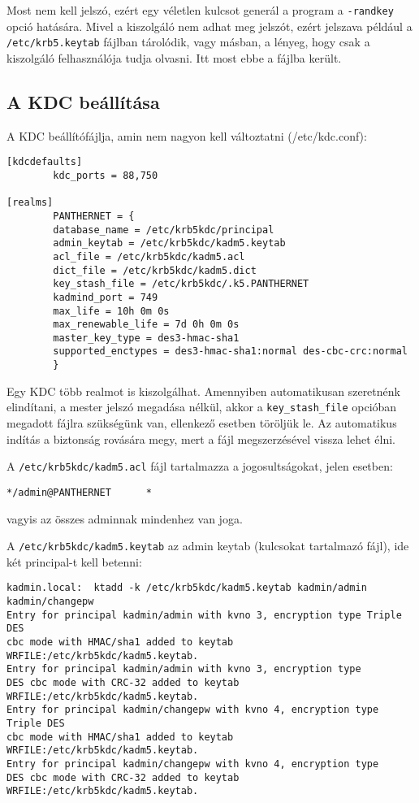 Most nem kell jelszó, ezért egy véletlen kulcsot generál a program a \texttt{-randkey} opció hatására. Mivel a
kiszolgáló nem adhat meg jelszót, ezért jelszava például a \texttt{/etc/krb5.keytab} fájlban tárolódik, vagy másban, a
lényeg, hogy csak a kiszolgáló felhasználója tudja olvasni. Itt most ebbe a fájlba került.


\subsection{A KDC beállítása}
A  KDC beállítófájlja, amin nem nagyon kell változtatni (/etc/kdc.conf):


\begin{Verbatim}[frame=single,label=kdc.conf]
[kdcdefaults]
        kdc_ports = 88,750

[realms]
        PANTHERNET = {
        database_name = /etc/krb5kdc/principal
        admin_keytab = /etc/krb5kdc/kadm5.keytab
        acl_file = /etc/krb5kdc/kadm5.acl
        dict_file = /etc/krb5kdc/kadm5.dict
        key_stash_file = /etc/krb5kdc/.k5.PANTHERNET
        kadmind_port = 749
        max_life = 10h 0m 0s
        max_renewable_life = 7d 0h 0m 0s
        master_key_type = des3-hmac-sha1
        supported_enctypes = des3-hmac-sha1:normal des-cbc-crc:normal
        }
\end{Verbatim}

Egy KDC több realmot is kiszolgálhat. Amennyiben automatikusan szeretnénk elindítani, a mester jelszó megadása
nélkül, akkor a \texttt{key\_stash\_file} opcióban megadott fájlra szükségünk van, ellenkező esetben töröljük le. Az
automatikus indítás a biztonság rovására megy, mert a fájl megszerzésével vissza lehet élni.

A \texttt{/etc/krb5kdc/kadm5.acl} fájl tartalmazza a jogosultságokat, jelen esetben:

\begin{Verbatim}[frame=single,label=kadm5.acl]
*/admin@PANTHERNET      *
\end{Verbatim}

vagyis az összes adminnak mindenhez van joga.

A \texttt{/etc/krb5kdc/kadm5.keytab} az admin keytab (kulcsokat tartalmazó fájl), ide két principal-t kell betenni:

\begin{Verbatim}[frame=single,label=principal keytab-hoz adása]
kadmin.local:  ktadd -k /etc/krb5kdc/kadm5.keytab kadmin/admin kadmin/changepw
Entry for principal kadmin/admin with kvno 3, encryption type Triple DES
cbc mode with HMAC/sha1 added to keytab WRFILE:/etc/krb5kdc/kadm5.keytab.
Entry for principal kadmin/admin with kvno 3, encryption type
DES cbc mode with CRC-32 added to keytab WRFILE:/etc/krb5kdc/kadm5.keytab.
Entry for principal kadmin/changepw with kvno 4, encryption type Triple DES
cbc mode with HMAC/sha1 added to keytab WRFILE:/etc/krb5kdc/kadm5.keytab.
Entry for principal kadmin/changepw with kvno 4, encryption type
DES cbc mode with CRC-32 added to keytab WRFILE:/etc/krb5kdc/kadm5.keytab.

\end{Verbatim}


